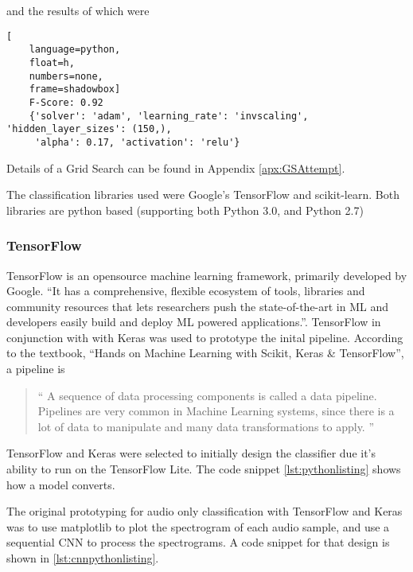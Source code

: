 \documentclass{UoNMCHA}
\newcommand{\inlineQuote}[1]{``#1''}
\newcommand{\fancyquote}[1]{\begin{quotation}\inlineQuote{#1}\end{quotation}}
\numberwithin{equation}{section}
\begin{document}
and the results of which were

\begin{lstlisting}[
    language=python,
    float=h,
    numbers=none,
    frame=shadowbox]
    F-Score: 0.92
    {'solver': 'adam', 'learning_rate': 'invscaling', 'hidden_layer_sizes': (150,),
     'alpha': 0.17, 'activation': 'relu'}
\end{lstlisting}

Details of a Grid Search can be found in Appendix \ref{apx:GSAttempt}.



The classification libraries used were Google's TensorFlow and scikit-learn. Both libraries are python based (supporting both Python 3.0, and Python 2.7) \cite{scikitlearnpythonVer} \cite{TFpythonVer}%

\subsubsection{TensorFlow}
TensorFlow is an opensource machine learning framework, primarily developed by Google.
\inlineQuote{It has a comprehensive, flexible ecosystem of tools, libraries and community resources that lets researchers push the state-of-the-art in ML and developers easily build and deploy ML powered applications.}\cite{TFwebsite}. TensorFlow in conjunction with with Keras was used to prototype the inital pipeline. According to the textbook, \inlineQuote{Hands on Machine Learning with Scikit, Keras \& TensorFlow}, a pipeline is 
\fancyquote{
A sequence of data processing components is called a data pipeline. Pipelines are very common in Machine Learning systems, since there is a lot of data to manipulate and many data transformations to apply\cite{HandsOnMLTextbook}.
}

TensorFlow and Keras were selected to initially design the classifier due it's ability to run on the TensorFlow Lite. The code snippet \ref{lst:pythonlisting} shows how a model converts.



The original prototyping for audio only classification with TensorFlow and Keras was to use matplotlib to plot the spectrogram of each audio sample, and use a sequential CNN to process the spectrograms. A code snippet for that design is shown in \ref{lst:cnnpythonlisting}.
\end{document}
